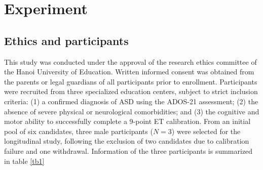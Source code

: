 


\section{Experiment}

\subsection{Ethics and participants}
This study was conducted under the approval of the research ethics committee of the Hanoi University of Education. Written informed consent was obtained from the parents or legal guardians of all participants prior to enrollment. Participants were recruited from three specialized education centers, subject to strict inclusion criteria: (1) a confirmed diagnosis of ASD using the ADOS-21 assessment; (2) the absence of severe physical or neurological comorbidities; and (3) the cognitive and motor ability to successfully complete a 9-point ET calibration. From an initial pool of six candidates, three male participants ($N=3$) were selected for the longitudinal study, following the exclusion of two candidates due to calibration failure and one withdrawal. Information of the three participants is summarized in table \ref{tb1}

